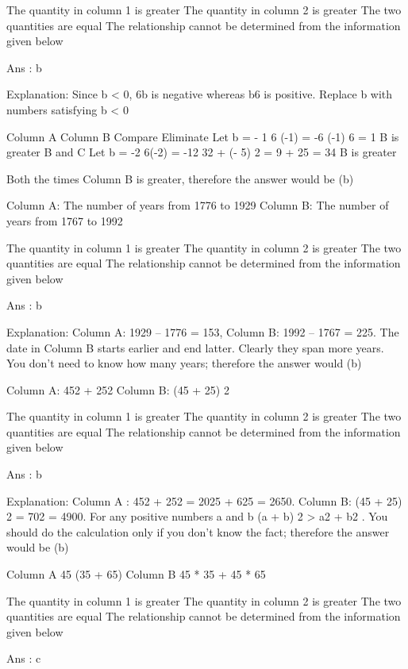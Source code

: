         The quantity in column 1 is greater
        The quantity in column 2 is greater
        The two quantities are equal
        The relationship cannot be determined from the information given below 

    Ans : b

    Explanation:
    Since b < 0, 6b is negative whereas b6 is positive. Replace b with numbers satisfying b < 0

        Column A    Column B    Compare     Eliminate
    Let b = - 1     6 (-1) = -6     (-1) 6 = 1  B is greater    B and C
    Let b = -2  6(-2) = -12     32 + (- 5) 2 = 9 + 25 = 34  B is greater      

    Both the times Column B is greater, therefore the answer would be (b)

    Column A: The number of years from 1776 to 1929
    Column B: The number of years from 1767 to 1992

        The quantity in column 1 is greater
        The quantity in column 2 is greater
        The two quantities are equal
        The relationship cannot be determined from the information given below 

    Ans : b

    Explanation:
    Column A: 1929 – 1776 = 153,
    Column B: 1992 – 1767 = 225.
    The date in Column B starts earlier and end latter. Clearly they span more years. You don’t need to know how many years; therefore the answer would (b)

    Column A: 452 + 252
    Column B: (45 + 25) 2

        The quantity in column 1 is greater
        The quantity in column 2 is greater
        The two quantities are equal
        The relationship cannot be determined from the information given below 

    Ans : b

    Explanation:
    Column A : 452 + 252 = 2025 + 625 = 2650.
    Column B: (45 + 25) 2 = 702 = 4900.
    For any positive numbers a and b (a + b) 2 > a2 + b2 . You should do the calculation only if you don't know the fact; therefore the answer would be (b)

    Column A
    45 (35 + 65)
    Column B
    45 * 35 + 45 * 65

        The quantity in column 1 is greater
        The quantity in column 2 is greater
        The two quantities are equal
        The relationship cannot be determined from the information given below 

    Ans : c

